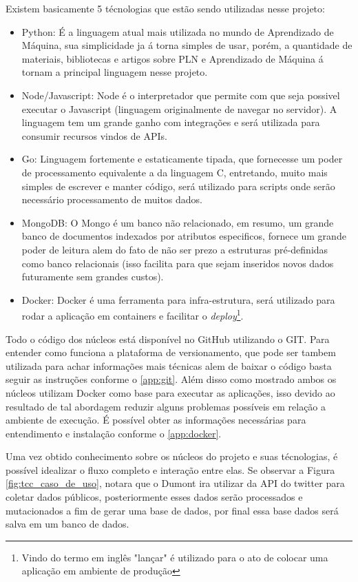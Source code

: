 Existem basicamente 5 técnologias que estão sendo utilizadas nesse projeto:
\begin{itemize}
 \item Python: É a linguagem atual mais utilizada no mundo de Aprendizado de Máquina, sua simplicidade ja á torna simples de usar, porém, a quantidade de materiais, bibliotecas e artigos sobre PLN e Aprendizado de Máquina á tornam a principal linguagem nesse projeto.
 \item Node/Javascript: Node é o interpretador que permite com que seja possivel executar o Javascript (linguagem originalmente de navegar no servidor). A linguagem tem um grande ganho com integrações e será utilizada para consumir recursos vindos de APIs.
 \item Go: Linguagem fortemente e estaticamente tipada, que fornecesse um poder de processamento equivalente a da linguagem C, entretando, muito mais simples de escrever e manter código, será utilizado para scripts onde serão necessário processamento de muitos dados.
 \item MongoDB: O Mongo é um banco não relacionado, em resumo, um grande banco de documentos indexados por atributos especificos, fornece um grande poder de leitura alem do fato de não ser prezo a estruturas pré-definidas como banco relacionais (isso facilita para que sejam inseridos novos dados futuramente sem grandes custos).
 \item Docker: Docker é uma ferramenta para infra-estrutura, será utilizado para rodar a aplicação em containers e facilitar o \textit{deploy}\footnote{Vindo do termo em inglês "lançar" é utilizado para o ato de colocar uma aplicação em ambiente de produção}.
\end{itemize}

Todo o código dos núcleos está disponível no GitHub utilizando o GIT. Para entender como funciona a plataforma de versionamento, que pode ser tambem utilizada para achar informações mais técnicas alem de baixar o código basta seguir as instruções conforme o \autoref{app:git}. Além disso como mostrado ambos os núcleos utilizam Docker como base para executar as aplicações, isso devido ao resultado de tal abordagem reduzir alguns problemas possíveis em relação a ambiente de execução. É possível obter as informações necessárias para entendimento e instalação conforme o \autoref{app:docker}.

Uma vez obtido conhecimento sobre os núcleos do projeto e suas técnologias, é possível idealizar o fluxo completo e interação entre elas. Se observar a Figura \ref{fig:tcc_caso_de_uso}, notara que o Dumont ira utilizar da API do twitter para coletar dados públicos, posteriormente esses dados serão processados e mutacionados a fim de gerar uma base de dados, por final essa base dados será salva em um banco de dados.

